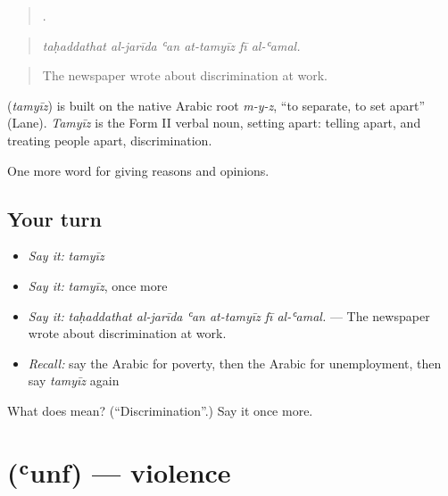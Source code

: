 \begin{quote}
     .
\end{quote}

\begin{quote}
\emph{taḥaddathat al-jarīda ʿan at-tamyīz fī al-ʿamal.}
\end{quote}

\begin{quote}
The newspaper wrote about discrimination at work.
\end{quote}

\begin{cousinweb}
\textbf{} (\emph{tamyīz}) is built on the native Arabic root \emph{m-y-z}, \textquotedblleft{}to separate, to set apart\textquotedblright{} (Lane). \emph{Tamyīz} is the Form II verbal noun, setting apart: telling apart, and treating people apart, discrimination.
\end{cousinweb}

\begin{grammarlens}[title={What you've built}]
One more word for giving reasons and opinions.
\end{grammarlens}

\subsection*{Your turn}
\begin{itemize}
\raggedright
  \item \emph{Say it:} \emph{tamyīz}
  \item \emph{Say it:} \emph{tamyīz}, once more
  \item \emph{Say it:} \emph{taḥaddathat al-jarīda ʿan at-tamyīz fī al-ʿamal.} — The newspaper wrote about discrimination at work.
  \item \emph{Recall:} say the Arabic for poverty, then the Arabic for unemployment, then say \emph{tamyīz} again
\end{itemize}

\begin{tcolorbox}[breakable,colback=teal!4,colframe=teal!35!black,title={Before you move on}]
What does  mean? (\textquotedblleft{}Discrimination\textquotedblright{}.) Say it once more.
\end{tcolorbox}
\section[\texorpdfstring{\ar{عنف} (ʿunf)}{عنف (ʿunf)}]{ (ʿunf) — violence}

